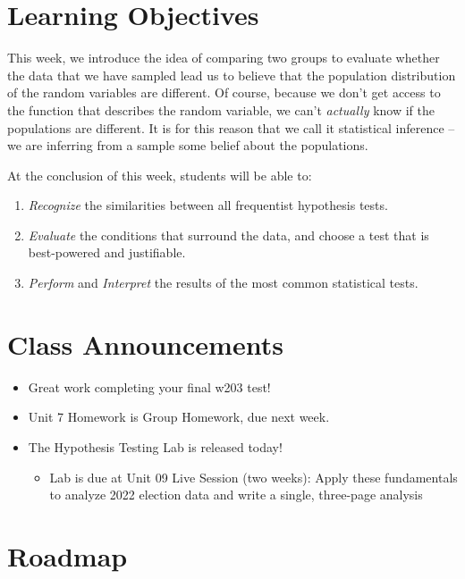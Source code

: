 \documentclass[
  letterpaper,
  DIV=11,
  numbers=noendperiod]{scrreprt}
\providecommand{\tightlist}{%
  \setlength{\itemsep}{0pt}\setlength{\parskip}{0pt}}\usepackage{longtable,booktabs,array}
\begin{document}
\section{Learning Objectives}\label{learning-objectives-6}

This week, we introduce the idea of comparing two groups to evaluate
whether the data that we have sampled lead us to believe that the
population distribution of the random variables are different. Of
course, because we don't get access to the function that describes the
random variable, we can't \emph{actually} know if the populations are
different. It is for this reason that we call it statistical inference
-- we are inferring from a sample some belief about the populations.

At the conclusion of this week, students will be able to:

\begin{enumerate}
\def\labelenumi{\arabic{enumi}.}
\tightlist
\item
  \emph{Recognize} the similarities between all frequentist hypothesis
  tests.
\item
  \emph{Evaluate} the conditions that surround the data, and choose a
  test that is best-powered and justifiable.
\item
  \emph{Perform} and \emph{Interpret} the results of the most common
  statistical tests.
\end{enumerate}

\section{Class Announcements}\label{class-announcements-5}

\begin{itemize}
\tightlist
\item
  Great work completing your final w203 test!
\item
  Unit 7 Homework is Group Homework, due next week.
\item
  The Hypothesis Testing Lab is released today!

  \begin{itemize}
  \tightlist
  \item
    Lab is due at Unit 09 Live Session (two weeks): Apply these
    fundamentals to analyze 2022 election data and write a single,
    three-page analysis
  \end{itemize}
\end{itemize}

\section{Roadmap}\label{roadmap-3}
\end{document}
